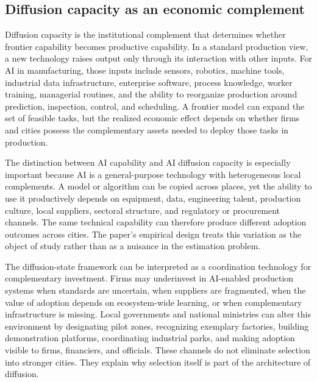 
\subsection{Diffusion capacity as an economic complement}
\label{subsec:diffusion_capacity_complement}

Diffusion capacity is the institutional complement that determines whether frontier capability becomes productive capability. In a standard production view, a new technology raises output only through its interaction with other inputs. For AI in manufacturing, those inputs include sensors, robotics, machine tools, industrial data infrastructure, enterprise software, process knowledge, worker training, managerial routines, and the ability to reorganize production around prediction, inspection, control, and scheduling. A frontier model can expand the set of feasible tasks, but the realized economic effect depends on whether firms and cities possess the complementary assets needed to deploy those tasks in production.

The distinction between AI capability and AI diffusion capacity is especially important because AI is a general-purpose technology with heterogeneous local complements. A model or algorithm can be copied across places, yet the ability to use it productively depends on equipment, data, engineering talent, production culture, local suppliers, sectoral structure, and regulatory or procurement channels. The same technical capability can therefore produce different adoption outcomes across cities. The paper's empirical design treats this variation as the object of study rather than as a nuisance in the estimation problem.

The diffusion-state framework can be interpreted as a coordination technology for complementary investment. Firms may underinvest in AI-enabled production systems when standards are uncertain, when suppliers are fragmented, when the value of adoption depends on ecosystem-wide learning, or when complementary infrastructure is missing. Local governments and national ministries can alter this environment by designating pilot zones, recognizing exemplary factories, building demonstration platforms, coordinating industrial parks, and making adoption visible to firms, financiers, and officials. These channels do not eliminate selection into stronger cities. They explain why selection itself is part of the architecture of diffusion.

